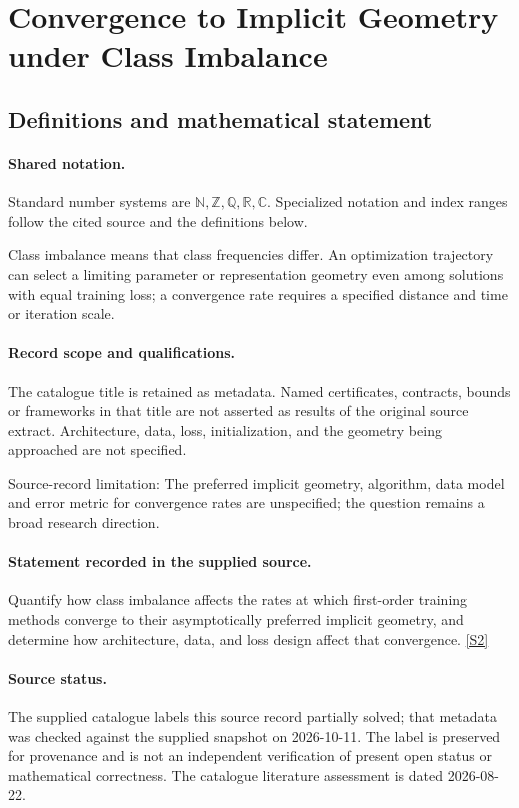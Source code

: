\documentclass[11pt]{article}
\newcommand{\sref}[2]{\hyperlink{source:#1:#2}{[S#2]}}
\begin{document}
\section{Convergence to Implicit Geometry under Class Imbalance}\label{statement}

\subsection{Definitions and mathematical statement}

\paragraph{Shared notation.}Standard number systems are $\mathbb N,\mathbb Z,\mathbb Q,\mathbb R,\mathbb C$. Specialized notation and index ranges follow the cited source and the definitions below.


Class imbalance means that class frequencies differ. An optimization trajectory can select a limiting parameter or representation geometry even among solutions with equal training loss; a convergence rate requires a specified distance and time or iteration scale.
\paragraph{Record scope and qualifications.}
The catalogue title is retained as metadata. Named certificates, contracts, bounds or frameworks in that title are not asserted as results of the original source extract.
Architecture, data, loss, initialization, and the geometry being approached are not specified.

Source-record limitation: The preferred implicit geometry, algorithm, data model and error metric for convergence rates are unspecified; the question remains a broad research direction.
\paragraph{Statement recorded in the supplied source.}
Quantify how class imbalance affects the rates at which first-order training methods converge to their asymptotically preferred implicit geometry, and determine how architecture, data, and loss design affect that convergence. \sref{statement}{2}
\paragraph{Source status.}
The supplied catalogue labels this source record partially solved; that metadata was checked against the supplied snapshot on 2026-10-11. The label is preserved for provenance and is not an independent verification of present open status or mathematical correctness. The catalogue literature assessment is dated 2026-08-22.
\end{document}
